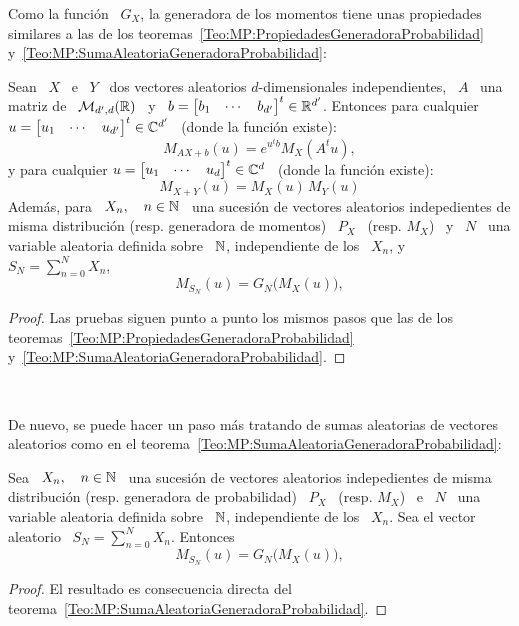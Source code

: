 Como la funci\'on \ $G_X$, la  generadora de los momentos tiene unas propiedades
similares  a las  de  los teoremas~\ref{Teo:MP:PropiedadesGeneradoraProbabilidad}
y~\ref{Teo:MP:SumaAleatoriaGeneradoraProbabilidad}:
%
\begin{teorema}%
\label{Teo:MP:PropiedadesGeneradoraMomentos}
%
  Sean  \   $X$  \  e  \   $Y$  \  dos   vectores  aleatorios  $d$-dimensionales
  independientes,  \ $A$  \ una  matriz de  \  $\mathcal{M}_{d',d}(\mathbb{R})$ \  y \  $b
  =   \begin{bmatrix}    b_1   &    \cdots   &   b_{d'}    \end{bmatrix}^t   \in
  \mathbb{R}^{d'}$.  Entonces para  cualquier $u  =  \begin{bmatrix} u_1  & \cdots  &
    u_{d'} \end{bmatrix}^t \in \mathbb{C}^{d'}$ \ (donde la funci\'on existe):
  \[
  M_{A X + b}(u) =  e^{u^t b} M_X\left( A^t u \right),
  \]
  y para cualquier  $u = \begin{bmatrix} u_1 & \cdots  & u_d \end{bmatrix}^t \in
  \mathbb{C}^d$ \ (donde la funci\'on existe):
  \[
  M_{X+Y}(u) = M_X(u) \, M_Y(u)
  \]
  Adem\'as,  para \  $X_n, \quad  n  \in \mathbb{N}$  \, una  sucesi\'on de  vectores
  aleatorios  indepedientes  de   misma  distribuci\'on  (resp.   generadora  de
  momentos) \ $P_X$ \ (resp. $M_X$) \  y \ $N$ \ una variable aleatoria definida
  sobre \ $\mathbb{N}$, independiente de los \ $X_n$, y \ $ S_N = \sum_{n=0}^N X_n$,
  \[
  M_{S_N}(u) =  G_N \big( M_X(u) \big),
  \]
\end{teorema}
%
\begin{proof}
  Las  pruebas  siguen   punto  a  punto  los  mismos  pasos   que  las  de  los
  teoremas~\ref{Teo:MP:PropiedadesGeneradoraProbabilidad}
  y~\ref{Teo:MP:SumaAleatoriaGeneradoraProbabilidad}.
\end{proof}

\

De nuevo, se puede hacer un  paso m\'as tratando de sumas aleatorias de vectores
aleatorios como en el teorema~\ref{Teo:MP:SumaAleatoriaGeneradoraProbabilidad}:
%
\begin{teorema}
\label{Teo:MP:SumaAleatoriaGeneradoraMomentos}
%
  Sea  \ $X_n,  \quad n  \in  \mathbb{N}$ \,  una sucesi\'on  de vectores  aleatorios
  indepedientes de  misma distribuci\'on  (resp.  generadora de  probabilidad) \
  $P_X$ \  (resp. $M_X$) \  e \  $N$ \ una  variable aleatoria definida  sobre \
  $\mathbb{N}$,  independiente de los  \ $X_n$.  Sea el  vector aleatorio  \ $  S_N =
  \sum_{n=0}^N X_n$. Entonces
  \[
  M_{S_N}(u) =  G_N \big( M_X(u) \big),
  \]
\end{teorema}
%
\begin{proof}
  El         resultado        es         consecuencia         directa        del
  teorema~\ref{Teo:MP:SumaAleatoriaGeneradoraProbabilidad}.
\end{proof}


